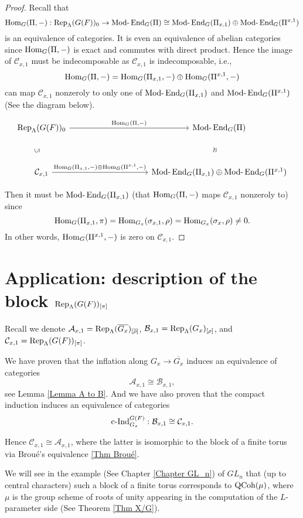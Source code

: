 		\begin{proof}
			Recall that 
			$$\operatorname{\operatorname{Hom}}_G(\Pi, -): \operatorname{\operatorname{Rep}}_{\Lambda}(G(F))_0 \to \operatorname{Mod-}\operatorname{\operatorname{End}}_G(\Pi) \cong \operatorname{Mod-}\operatorname{\operatorname{End}}_G(\Pi_{x,1}) \oplus \operatorname{Mod-}\operatorname{\operatorname{End}}_G(\Pi^{x,1})$$ 
			is an equivalence of categories. It is even an equivalence of abelian categories since $\operatorname{\operatorname{Hom}}_G(\Pi, -)$ is exact and commutes with direct product. Hence the image of $\mathcal{C}_{x,1}$ must be indecomposable as $\mathcal{C}_{x,1}$ is indecomposable, i.e., 
			$$\operatorname{\operatorname{Hom}}_G(\Pi, -)=\operatorname{\operatorname{Hom}}_G(\Pi_{x,1}, -) \oplus \operatorname{\operatorname{Hom}}_G(\Pi^{x,1}, -)$$
			can map $\mathcal{C}_{x,1}$ nonzeroly to only one of $\operatorname{Mod-}\operatorname{\operatorname{End}}_G(\Pi_{x,1})$ and $\operatorname{Mod-}\operatorname{\operatorname{End}}_G(\Pi^{x,1})$ (See the diagram below). 
			
			\[\begin{tikzcd}
				{\Rep_{\Lambda}(G(F))_0} &&&& {\Modr \End_G(\Pi)} \\
				\\
				{\mathcal{C}_{x,1}} &&&& {\Modr \End_G(\Pi_{x,1}) \oplus \Modr \End_G(\Pi^{x,1})}
				\arrow["{\Hom_G(\Pi, -)}", from=1-1, to=1-5]
				\arrow["{\Hom_G(\Pi_{x,1}, -) \oplus \Hom_G(\Pi^{x,1}, -)}", from=3-1, to=3-5]
				\arrow["\subseteq", sloped, draw=none, from=3-1, to=1-1]
				\arrow["\cong", sloped, draw=none, from=3-5, to=1-5]
			\end{tikzcd}\]
			
			Then it must be $\operatorname{Mod-}\operatorname{\operatorname{End}}_G(\Pi_{x,1})$ (that $\operatorname{\operatorname{Hom}}_G(\Pi, -)$ maps $\mathcal{C}_{x,1}$ nonzeroly to) since 
			$$\operatorname{\operatorname{Hom}}_G(\Pi_{x,1}, \pi)=\operatorname{\operatorname{Hom}}_{G_x}(\sigma_{x,1}, \rho)=\operatorname{\operatorname{Hom}}_{G_x}(\sigma_x, \rho) \neq 0.$$
			In other words, $\operatorname{\operatorname{Hom}}_G(\Pi^{x,1}, -)$ is zero on $\mathcal{C}_{x,1}$.
			
		\end{proof}
		
		
		\section{Application: description of the block $\operatorname{\operatorname{Rep}}_{\Lambda}(G(F))_{[\pi]}$}\label{Section rep application}
		
		Recall we denote $\mathcal{A}_{x,1}=\operatorname{\operatorname{Rep}}_{\Lambda}(\overline{G_x})_{[\overline{\rho}]}$, $\mathcal{B}_{x,1}=\operatorname{\operatorname{Rep}}_{\Lambda}(G_x)_{[\rho]}$, and $\mathcal{C}_{x,1}=\operatorname{\operatorname{Rep}}_{\Lambda}(G(F))_{[\pi]}$.
		
		We have proven that the inflation along $G_x \to \overline{G_x}$ induces an equivalence of categories 
		$$\mathcal{A}_{x,1} \cong \mathcal{B}_{x,1},$$
		see Lemma \ref{Lemma A to B}. And we have also proven that the compact induction induces an equivalence of categories
		$$\operatorname{\operatorname{c-Ind}}_{G_x}^{G(F)}: \mathcal{B}_{x,1} \cong \mathcal{C}_{x,1}.$$
		
		Hence $\mathcal{C}_{x,1} \cong \mathcal{A}_{x,1}$, where the latter is isomorphic to the block of a finite torus via Broué's equivalence \ref{Thm Broué}.
		
		We will see in the example (See Chapter \ref{Chapter GL_n}) of $GL_n$ that (up to central characters) such a block of a finite torus corresponds to $\operatorname{\operatorname{QCoh}}(\mu)$, where $\mu$ is the group scheme of roots of unity appearing in the computation of the $L$-parameter side (See Theorem \ref{Thm X/G}).
		

	
